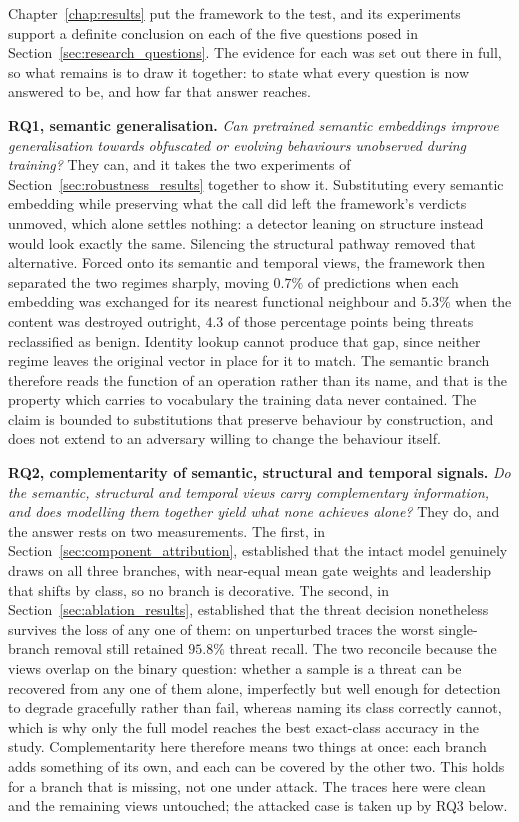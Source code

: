 \documentclass[%
    BCOR=10mm,
    DIV=13,
    toc=bibliography,
    toc=listof,
    oneside,
    12pt,
]{scrbook}
\begin{document}
Chapter~\ref{chap:results} put the framework to the test, and its experiments
support a definite conclusion on each of the five questions posed in
Section~\ref{sec:research_questions}. The evidence for each was set out there in
full, so what remains is to draw it together: to state what every question is now
answered to be, and how far that answer reaches.

\textbf{RQ1, semantic generalisation.} \emph{Can pretrained semantic embeddings
improve generalisation towards obfuscated or evolving behaviours unobserved during
training?} They can, and it takes the two experiments of
Section~\ref{sec:robustness_results} together to show it. Substituting every
semantic embedding while preserving what the call did left the framework's verdicts
unmoved, which alone settles nothing: a detector leaning on structure instead would
look exactly the same. Silencing the structural pathway removed that alternative.
Forced onto its semantic and temporal views, the framework then separated the two
regimes sharply, moving $0.7\%$ of predictions when each embedding was exchanged for
its nearest functional neighbour and $5.3\%$ when the content was destroyed
outright, $4.3$ of those percentage points being threats reclassified as benign.
Identity lookup cannot produce that gap, since neither regime leaves the original
vector in place for it to match. The semantic branch therefore reads the function of
an operation rather than its name, and that is the property which carries to
vocabulary the training data never contained. The claim is bounded to substitutions
that preserve behaviour by construction, and does not extend to an adversary willing
to change the behaviour itself.

\textbf{RQ2, complementarity of semantic, structural and temporal signals.} \emph{Do
the semantic, structural and temporal views carry complementary information, and
does modelling them together yield what none achieves alone?} They do, and the answer rests on two
measurements. The first, in Section~\ref{sec:component_attribution}, established that
the intact model genuinely draws on all three branches, with near-equal mean gate
weights and leadership that shifts by class, so no branch is decorative. The second,
in Section~\ref{sec:ablation_results}, established that the threat decision
nonetheless survives the loss of any one of them: on unperturbed traces the worst
single-branch removal still retained $95.8\%$ threat recall. The two reconcile because the views overlap on
the binary question: whether a sample is a threat can be recovered from any one of
them alone, imperfectly but well enough for detection to degrade gracefully rather
than fail, whereas naming its class correctly cannot, which is why only the full
model reaches the best exact-class accuracy in the study. Complementarity here therefore means two things at once: each branch adds
something of its own, and each can be covered by the other two. This holds for a
branch that is missing, not one under attack. The traces here were clean and the
remaining views untouched; the attacked case is taken up by RQ3 below.
\end{document}
